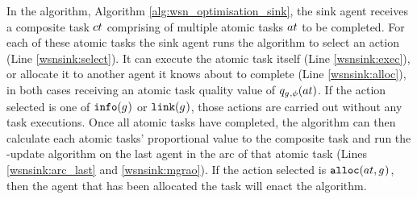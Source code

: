 In the \acronymWSNOptimisationSink{}{} algorithm, Algorithm \ref{alg:wsn_optimisation_sink}, the sink agent receives a composite task $\varCompositeTask{}{}$ comprising of multiple atomic tasks $\varAtomicTask{}{}$ to be completed. For each of these atomic tasks the sink agent runs the \acronymATARIA{}{} algorithm to select an action (Line \ref{wsnsink:select}). It can execute the atomic task itself (Line \ref{wsnsink:exec}), or allocate it to another agent it knows about to complete (Line \ref{wsnsink:alloc}), in both cases receiving an atomic task quality value of $\functionAtomicTaskQualitySignature{}{}$. If the action selected is one of $\texttt{info}(g_{}^{})$ or $\texttt{link}(g_{}^{})$, those actions are carried out without any task executions. Once all atomic tasks have completed, the algorithm can then calculate each atomic tasks' proportional value to the composite task  and run the \acronymMGRAO{}{}-update algorithm on the last agent in the arc of that atomic task (Lines \ref{wsnsink:arc_last} and \ref{wsnsink:mgrao}). If the action selected is $\functionAlloc{}{}$, then the agent that has been allocated the task will enact the \acronymWSNOptimisationArc{}{} algorithm.

